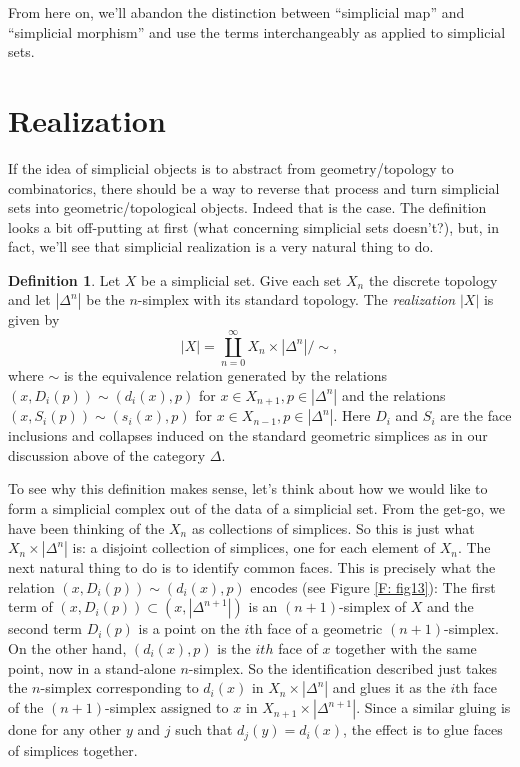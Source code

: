 \documentclass[12pt]{article}
\theoremstyle{plain}
\theoremstyle{definition}
\newtheorem{definition}[theorem]{Definition}
\theoremstyle{remark}
\begin{document}
From here on, we'll abandon the distinction between ``simplicial map'' and ``simplicial morphism'' and use the terms interchangeably as applied to simplicial sets. 
















\section{Realization}\label{S: realization}



If the idea of simplicial objects is to abstract from geometry/topology to combinatorics, there should be a way to reverse that process and turn simplicial sets into geometric/topological objects. Indeed that is the case. The definition looks a bit off-putting at first (what concerning simplicial sets doesn't?), but, in fact, we'll see that simplicial realization is a very natural thing to do.

\begin{definition}
Let $X$ be a simplicial set. Give each set $X_n$ the discrete topology and let $|\Delta^n|$ be the $n$-simplex with its standard topology. The \emph{realization} $|X|$ is given by $$|X|=\coprod_{n=0}^\infty X_n\times |\Delta^n|/\sim,$$
where $\sim$ is the equivalence relation generated by the relations $(x,D_i(p))\sim(d_i(x),p)$ for $x\in X_{n+1}, p\in |\Delta^n|$ and the relations $(x,S_i(p))\sim(s_i(x),p)$ for $x\in X_{n-1},p\in |\Delta^n|$. Here $D_i$ and $S_i$ are the face inclusions and collapses induced on the standard geometric simplices as in our discussion above of the category $\Delta$. 
\end{definition}



To see why this definition makes sense, let's think about how we would like to form a simplicial complex out of the data of a simplicial set. From the get-go, we have been thinking of the $X_n$ as collections of simplices. So this is just what $X_n\times |\Delta^n|$ is: a disjoint collection of simplices, one for each element of $X_n$. The next natural thing to do is to identify common faces. This is precisely what the relation $(x,D_i(p))\sim(d_i(x),p)$ encodes (see Figure \ref{F: fig13}): The first term of $(x, D_i(p))\subset (x,|\Delta^{n+1}|)$ is an $(n+1)$-simplex of $X$ and the second term $D_i(p)$ is a point on the $i$th face of a geometric $(n+1)$-simplex. On the other hand, $(d_i(x),p)$ is the $ith$ face of $x$ together with the same point, now in a stand-alone $n$-simplex. So the identification described just takes the $n$-simplex corresponding to $d_i(x)$ in $X_{n}\times |\Delta^n|$ and glues it as the $i$th face of the $(n+1)$-simplex assigned to $x$ in $X_{n+1}\times |\Delta^{n+1}|$. Since a similar gluing is done for any other $y$ and $j$ such that $d_j(y)=d_i(x)$, the effect is to glue faces of simplices together. 
\end{document}
